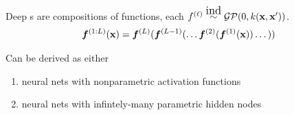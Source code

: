 \documentclass[portrait,a0b,final,a4resizeable]{include/a0poster}
\begin{document}
\begin{poster}
\begin{multicols}{2}


%

\vspace{0.5in} 


Deep \gp{}s are compositions of functions, each $f^{(\ell)} \simind \GPt{0}{k(\vx, \vx')}$. 
\begin{align*}
\boldsymbol{f}^{(1:L)}(\mathbf{x}) = \boldsymbol{f}^{(L)}(\boldsymbol{f}^{(L-1)}(\dots \boldsymbol{f}^{(2)}(\boldsymbol{f}^{(1)}(\mathbf{x})) \dots))
\end{align*}
%

Can be derived as either
\begin{enumerate}
	\item  neural nets with nonparametric activation functions
    \item  neural nets with infintely-many parametric hidden nodes
\end{enumerate}






































\end{multicols}
\end{poster}
\end{document}
